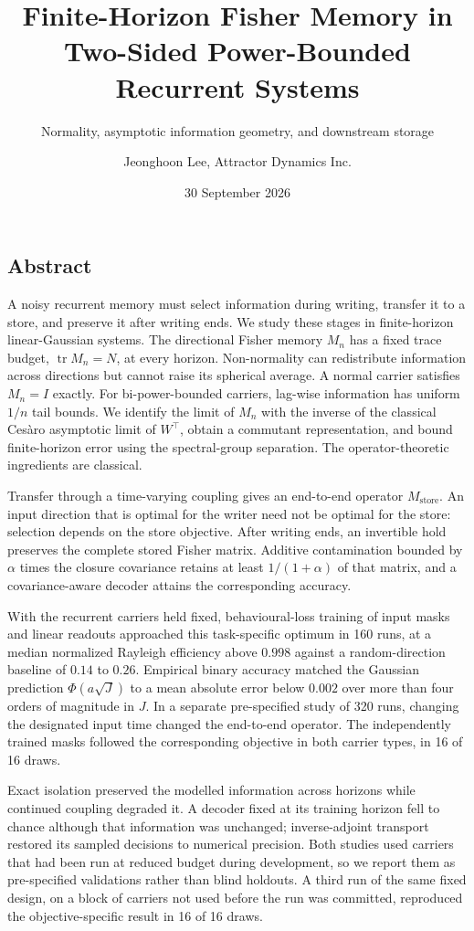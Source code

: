 \documentclass[
  10pt,
]{article}
\title{Finite-Horizon Fisher Memory in Two-Sided Power-Bounded Recurrent
Systems}
\subtitle{Normality, asymptotic information geometry, and downstream
storage}
\author{Jeonghoon Lee, Attractor Dynamics Inc.}
\date{30 September 2026}
\newenvironment{preprintabstract}{%
  \begin{list}{}{\setlength{\leftmargin}{9mm}\setlength{\rightmargin}{9mm}%
    \setlength{\labelwidth}{0pt}\setlength{\labelsep}{0pt}%
    \setlength{\itemindent}{0pt}\setlength{\listparindent}{0pt}%
    \setlength{\topsep}{3pt}\setlength{\parsep}{\parskip}}%
  \item\relax
}{\end{list}}
\begin{document}
\maketitle

\subsection{Abstract}\label{abstract}

\begin{preprintabstract}

A noisy recurrent memory must select information during writing,
transfer it to a store, and preserve it after writing ends. We study
these stages in finite-horizon linear-Gaussian systems. The directional
Fisher memory \(M_n\) has a fixed trace budget,
\(\operatorname{tr}M_n=N\), at every horizon. Non-normality can
redistribute information across directions but cannot raise its
spherical average. A normal carrier satisfies \(M_n=I\) exactly. For
bi-power-bounded carriers, lag-wise information has uniform \(1/n\) tail
bounds. We identify the limit of \(M_n\) with the inverse of the
classical Cesàro asymptotic limit of \(W^\top\), obtain a commutant
representation, and bound finite-horizon error using the spectral-group
separation. The operator-theoretic ingredients are classical.

Transfer through a time-varying coupling gives an end-to-end operator
\(M_{\mathrm{store}}\). An input direction that is optimal for the
writer need not be optimal for the store: selection depends on the store
objective. After writing ends, an invertible hold preserves the complete
stored Fisher matrix. Additive contamination bounded by \(\alpha\) times
the closure covariance retains at least \(1/(1+\alpha)\) of that matrix,
and a covariance-aware decoder attains the corresponding accuracy.

With the recurrent carriers held fixed, behavioural-loss training of
input masks and linear readouts approached this task-specific optimum in
160 runs, at a median normalized Rayleigh efficiency above \(0.998\)
against a random-direction baseline of \(0.14\) to \(0.26\). Empirical
binary accuracy matched the Gaussian prediction \(\Phi(a\sqrt J)\) to a
mean absolute error below \(0.002\) over more than four orders of
magnitude in \(J\). In a separate pre-specified study of 320 runs,
changing the designated input time changed the end-to-end operator. The
independently trained masks followed the corresponding objective in both
carrier types, in 16 of 16 draws.

Exact isolation preserved the modelled information across horizons while
continued coupling degraded it. A decoder fixed at its training horizon
fell to chance although that information was unchanged; inverse-adjoint
transport restored its sampled decisions to numerical precision. Both
studies used carriers that had been run at reduced budget during
development, so we report them as pre-specified validations rather than
blind holdouts. A third run of the same fixed design, on a block of
carriers not used before the run was committed, reproduced the
objective-specific result in 16 of 16 draws.

\end{preprintabstract}
\end{document}
